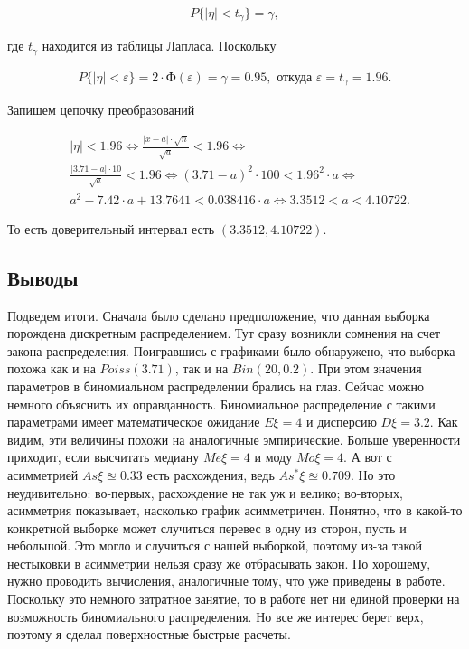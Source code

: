 \documentclass[14pt,a4paper]{scrartcl}
\theoremstyle{definition}
\theoremstyle{remark}
\theoremstyle{definition}
\theoremstyle{definition}
\begin{document}
\begin{align*}
  P\{|\eta| < t_{\gamma}\} = \gamma,
\end{align*}

где $t_{\gamma}$ находится из таблицы Лапласа. Поскольку

\begin{align*}
  P\{|\eta| < \varepsilon\} = 2 \cdot \text{Ф}(\varepsilon) = \gamma = 0.95, \text{ откуда } \varepsilon = t_{\gamma} = 1.96.
\end{align*}

Запишем цепочку преобразований

\begin{align*}
  &|\eta| < 1.96 \iff \frac{|\overline{x}-a|\cdot \sqrt{n}}{\sqrt{a}} < 1.96 \iff \\
  &\frac{|3.71-a|\cdot 10}{\sqrt{a}} < 1.96 \iff (3.71-a)^2 \cdot 100 < 1.96^2 \cdot a \iff \\
  &a^2-7.42\cdot a + 13.7641 < 0.038416\cdot a \iff 3.3512 < a < 4.10722.
\end{align*}

То есть доверительный интервал есть $(3.3512, 4.10722).$

\subsection{Выводы}

Подведем итоги. Сначала было сделано предположение, что данная выборка порождена дискретным распределением. Тут сразу возникли сомнения на счет закона распределения. Поигравшись с графиками было обнаружено, что выборка похожа как и на $Poiss(3.71)$, так и на $Bin(20, 0.2)$. При этом значения параметров в биномиальном распределении брались на глаз. Сейчас можно немного объяснить их оправданность. Биномиальное распределение с такими параметрами имеет математическое ожидание $E\xi = 4$ и дисперсию $D\xi = 3.2$. Как видим, эти величины похожи на аналогичные эмпирические. Больше уверенности приходит, если высчитать медиану $Me\xi = 4$ и моду $Mo\xi = 4$. А вот с асимметрией $As\xi \approxeq 0.33$ есть расхождения, ведь $As^{*}\xi \approxeq 0.709$. Но это неудивительно: во-первых, расхождение не так уж и велико; во-вторых, асимметрия показывает, насколько график асимметричен. Понятно, что в какой-то конкретной выборке может случиться перевес в одну из сторон, пусть и небольшой. Это могло и случиться с нашей выборкой, поэтому из-за такой нестыковки в асимметрии нельзя сразу же отбрасывать закон. По хорошему, нужно проводить вычисления, аналогичные тому, что уже приведены в работе. Поскольку это немного затратное занятие, то в работе нет ни единой проверки на возможность биномиального распределения. Но все же интерес берет верх, поэтому я сделал поверхностные быстрые расчеты.
\end{document}
